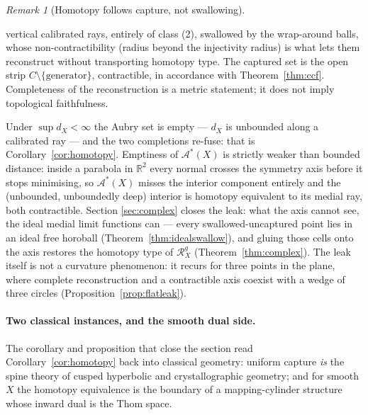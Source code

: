 \documentclass[11pt]{article}
\theoremstyle{remark}
\newtheorem{remark}[theorem]{Remark}
\newcommand{\R}{\mathbb{R}}
\newcommand{\X}{X}
\newcommand{\Rg}{\mathcal{R}^{g}_{\X}}
\newcommand{\dX}{d_{\X}}
\newcommand{\Aub}{\mathcal{A}^{\ast}}
\begin{document}
\begin{remark}[Homotopy follows capture, not swallowing]
\begin{itemize}
vertical calibrated rays, entirely of class (2), swallowed by the
wrap-around balls, whose non-contractibility (radius beyond the
injectivity radius) is what lets them reconstruct without
transporting homotopy type. The captured set is the open strip
$C\setminus\{\text{generator}\}$, contractible, in accordance with
Theorem~\ref{thm:ccf}. Completeness of the reconstruction is a
metric statement; it does not imply topological faithfulness.
\end{itemize}
Under $\sup\dX<\infty$ the Aubry set is empty --- $\dX$ is
unbounded along a calibrated ray --- and the two completions
re-fuse: that is Corollary~\ref{cor:homotopy}. Emptiness of
$\Aub(\X)$ is strictly weaker than bounded distance: inside a
parabola in $\R^{2}$ every normal crosses the symmetry axis before
it stops minimising, so $\Aub(\X)$ misses the interior component
entirely and the (unbounded, unboundedly deep) interior is homotopy
equivalent to its medial ray, both contractible. Section
\ref{sec:complex} closes the leak: what the axis cannot see, the
ideal medial limit functions can --- every swallowed-uncaptured
point lies in an ideal free horoball
(Theorem~\ref{thm:idealswallow}), and gluing those cells onto the
axis restores the homotopy type of $\Rg$
(Theorem~\ref{thm:complex}). The leak itself is not a curvature
phenomenon: it recurs for three points in the plane, where complete
reconstruction and a contractible axis coexist with a wedge of
three circles (Proposition~\ref{prop:flatleak}).
\end{remark}

\paragraph{Two classical instances, and the smooth dual side.} The
corollary and proposition that close the section read
Corollary~\ref{cor:homotopy} back into classical geometry: uniform
capture \emph{is} the spine theory of cusped hyperbolic and
crystallographic geometry; and for smooth $\X$ the homotopy
equivalence is the boundary of a mapping-cylinder structure whose
inward dual is the Thom space.
\end{document}
